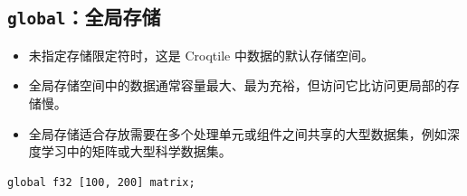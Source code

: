 \subsection*{\texttt{global}：全局存储}

\begin{itemize}[leftmargin=1.6em]
\item 未指定存储限定符时，这是 Croqtile 中数据的默认存储空间。
\item 全局存储空间中的数据通常容量最大、最为充裕，但访问它比访问更局部的存储慢。
\item 全局存储适合存放需要在多个处理单元或组件之间共享的大型数据集，例如深度学习中的矩阵或大型科学数据集。
\end{itemize}

\begin{lstlisting}[language=croqtile,caption={全局存储声明}]
global f32 [100, 200] matrix;
\end{lstlisting}
